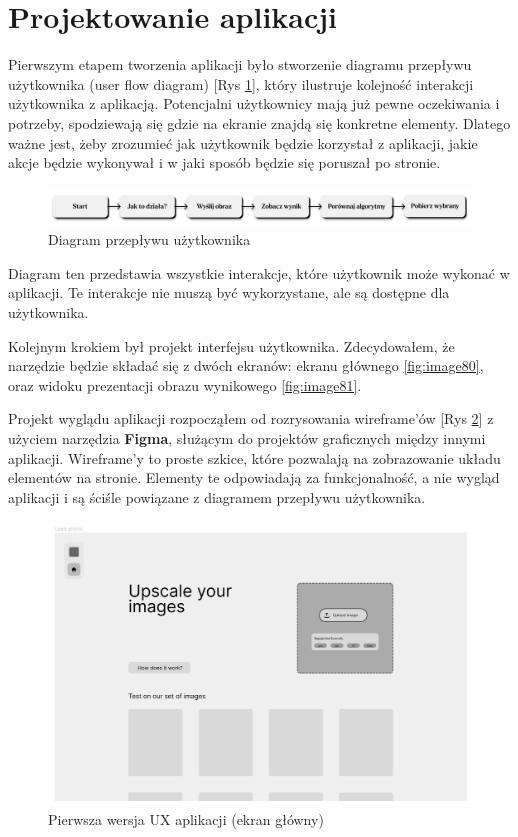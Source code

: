 \section{Projektowanie aplikacji}

Pierwszym etapem tworzenia aplikacji było stworzenie diagramu przepływu użytkownika (user flow diagram) [Rys \ref{fig:image82}], który ilustruje kolejność interakcji użytkownika z aplikacją. Potencjalni użytkownicy mają już pewne oczekiwania i potrzeby, spodziewają się gdzie na ekranie znajdą się konkretne elementy. Dlatego ważne jest, żeby zrozumieć jak użytkownik będzie korzystał z aplikacji, jakie akcje będzie wykonywał i w jaki sposób będzie się poruszał po stronie.

\begin{figure}[ht]
    \centering
    \includegraphics[width=\linewidth]{Rozdziały/06.Aplikacja/Obrazy/user-flow.png}  
    \caption{Diagram przepływu użytkownika}
    \label{fig:image82}
\end{figure}

Diagram ten przedstawia wszystkie interakcje, które użytkownik może wykonać w aplikacji. Te interakcje nie muszą być wykorzystane, ale są dostępne dla użytkownika.

Kolejnym krokiem był projekt interfejsu użytkownika. Zdecydowałem, że narzędzie będzie składać się z dwóch ekranów: ekranu głównego \ref{fig:image80}, oraz widoku prezentacji obrazu wynikowego \ref{fig:image81}.

Projekt wyglądu aplikacji rozpocząłem od rozrysowania wireframe'ów [Rys \ref{fig:image83}] z użyciem narzędzia \textbf{Figma}, służącym do projektów graficznych między innymi aplikacji. Wireframe'y to proste szkice, które pozwalają na zobrazowanie układu elementów na stronie. Elementy te odpowiadają za funkcjonalność, a nie wygląd aplikacji i są ściśle powiązane z diagramem przepływu użytkownika.

\begin{figure}[ht]
    \centering
    \includegraphics[width=0.8\linewidth]{Rozdziały/06.Aplikacja/Obrazy/UX upload.png}  
    \caption{Pierwsza wersja UX aplikacji (ekran główny)}
    \label{fig:image83}
\end{figure}

